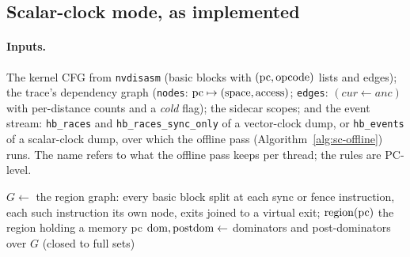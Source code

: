 \subsection*{Scalar-clock mode, as implemented}

\paragraph{Inputs.}
The kernel CFG from \texttt{nvdisasm} (basic blocks with $(\operatorname{pc},\text{opcode})$ lists and
edges); the trace's dependency graph (\texttt{nodes}: $\operatorname{pc}\mapsto(\text{space},\text{access})$;
\texttt{edges}: $(\mathit{cur}\leftarrow\mathit{anc})$ with per-distance counts and a
\emph{cold} flag); the sidecar scopes; and the event stream: \texttt{hb\_races} and
\texttt{hb\_races\_sync\_only} of a vector-clock dump, or \texttt{hb\_events} of a
scalar-clock dump, over which the offline pass (Algorithm~\ref{alg:sc-offline}) runs.
The name refers to what the offline pass keeps per thread; the rules are PC-level.

\begin{algorithm}[H]
\small
\caption{Scalar-clock mode --- region graph and static facts (\texttt{sync\_dominance.py})}\label{alg:sc-static}
$G\gets$ the region graph: every basic block split at each sync or fence instruction, each such instruction its own node, exits joined to a virtual exit; $\operatorname{region}(\operatorname{pc})$ the region holding a memory pc\;
$\operatorname{dom},\operatorname{postdom}\gets$ dominators and post-dominators over $G$ (closed to full sets)\;
\end{algorithm}

